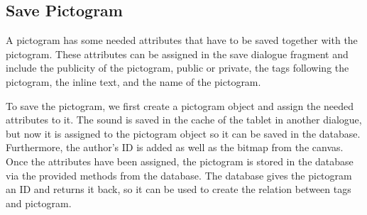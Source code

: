 \subsection{Save Pictogram}
A pictogram has some needed attributes that have to be saved together with the pictogram.
These attributes can be assigned in the save dialogue fragment and include the publicity of the pictogram, public or private, the tags following the pictogram, the inline text, and the name of the pictogram.

To save the pictogram, we first create a pictogram object and assign the needed attributes to it.
The sound is saved in the cache of the tablet in another dialogue, but now it is assigned to the pictogram object so it can be saved in the database.
Furthermore, the author's ID is added as well as the bitmap from the canvas.
Once the attributes have been assigned, the pictogram is stored in the database via the provided methods from the database.
The database gives the pictogram an ID and returns it back, so it can be used to create the relation between tags and pictogram.